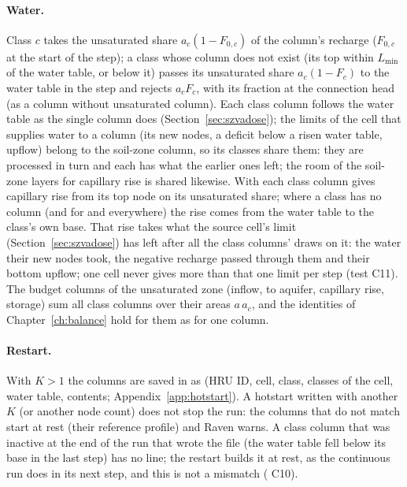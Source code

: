 \paragraph{Water.} Class $c$ takes the unsaturated share $a_c(1-F_{0,c})$ of the column's recharge ($F_{0,c}$ at the
start of the step); a class whose column does not exist (its top within $L_{\min}$ of the water table, or below it)
passes its unsaturated share $a_c(1-F_c)$ to the water table in the step and rejects $a_c F_c$, with its fraction at the
connection head (as a column without unsaturated column). Each class column follows the water table as the single
column does (Section~\ref{sec:szvadose}); the limits of the cell that supplies water to a column (its new nodes, a deficit
below a risen water table, upflow) belong to the soil-zone column, so its classes share them: they are processed in
turn and each has what the earlier ones left; the room of the soil-zone layers for capillary rise is shared likewise.
With  each class column gives capillary rise from its top node on its unsaturated share; where a class has
no column (and for  and  everywhere) the rise comes from the water table to the class's own base.
That rise takes what the source cell's limit (Section~\ref{sec:szvadose}) has left after all the class columns' draws on
it: the water their new nodes took, the negative recharge passed through them and their bottom upflow; one cell never
gives more than that one limit per step (test C11).
The budget columns of the unsaturated zone (inflow, to aquifer, capillary rise, storage) sum all class columns over
their areas $a\,a_c$, and the identities of Chapter~\ref{ch:balance} hold for them as for one column.

\paragraph{Restart.} With $K>1$ the columns are saved in  as  (HRU ID, cell,
class, classes of the cell, water table, contents; Appendix~\ref{app:hotstart}). A hotstart written with another $K$
(or another node count) does not stop the run: the columns that do not match start at rest (their reference profile)
and Raven warns. A class column that was inactive at the end of the run that wrote the file (the water table fell below
its base in the last step) has no line; the restart builds it at rest, as the continuous run does in its next step, and
this is not a mismatch ( C10).

